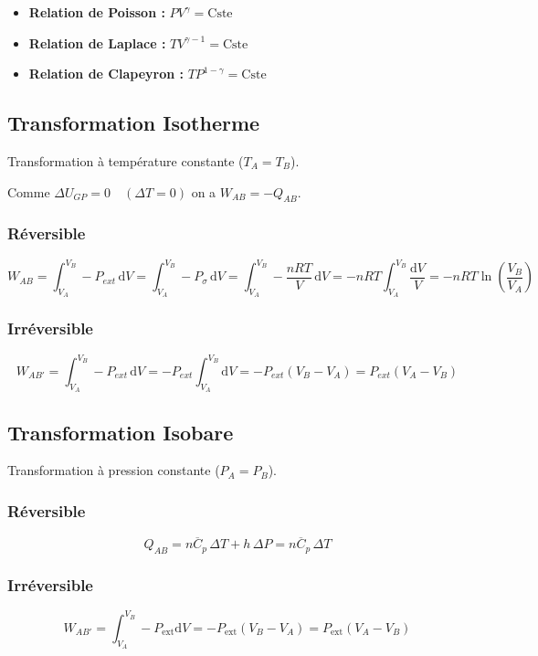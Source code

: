 \documentclass[a4paper,12pt]{article}
\newcommand{\diff}{\mathrm{d}} %
\newcommand{\re}{\textrm}
\newcommand{\Cp}{\overline{C}_p} %
\begin{document}
            \begin{itemize}[label=\textbullet]
                \item \textbf{Relation de Poisson :} $PV^\gamma = \re{Cste}$
                \item \textbf{Relation de Laplace :} $T V^{\gamma - 1} = \re{Cste}$
                \item \textbf{Relation de Clapeyron :} $T P^{1 - \gamma} = \re{Cste}$
            \end{itemize}

    \subsection{Transformation Isotherme}

        Transformation à température constante ($T_A=T_B$).
        
        Comme $ \Delta U_{GP} = 0 \quad (\Delta T = 0) $ on a $W_{AB} = -Q_{AB}$.

        \subsubsection{Réversible}
            $$ W_{AB} = \int_{V_A}^{V_B} -P_{ext} \, \diff V = \int_{V_A}^{V_B} -P_\sigma \, \diff V = \int_{V_A}^{V_B} -\frac{nRT}{V} \, \diff V = -nRT \int_{V_A}^{V_B} \frac{\diff V}{V} = -nRT \ln{\left(\frac{V_B}{V_A}\right)} $$

        \subsubsection{Irréversible}
            $$ W_{AB'} = \int_{V_A}^{V_B} -P_{ext} \, \diff V = -P_{ext} \int_{V_A}^{V_B} \diff V = -P_{ext} (V_B - V_A) = P_{ext} (V_A- V_B) $$

    \subsection{Transformation Isobare}
        
        Transformation à pression constante ($P_A=P_B$).

        \subsubsection{Réversible}
            $$ Q_{AB} = n \Cp \, \Delta T + h \, \Delta P = n \Cp \, \Delta T $$
        
        \subsubsection{Irréversible}
            $$ W_{AB'} = \int_{V_A}^{V_B} -P_{\text{ext}} \diff V = -P_{\text{ext}}(V_B-V_A) = P_{\text{ext}}(V_A-V_B) $$
\end{document}

